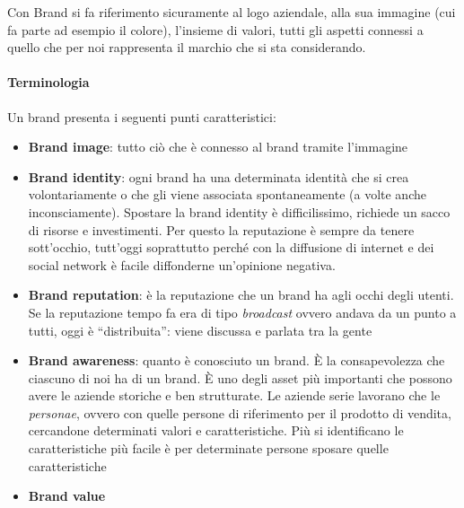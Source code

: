 Con Brand si fa riferimento sicuramente al logo aziendale, alla sua immagine
(cui fa parte ad esempio il colore), l'insieme di valori, tutti gli aspetti
connessi a quello che per noi rappresenta il marchio che si sta considerando.

\paragraph*{Terminologia} Un brand presenta i seguenti punti caratteristici:
\begin{itemize}
 \item \textbf{Brand image}: tutto ciò che è connesso al brand tramite
l'immagine
 \item \textbf{Brand identity}: ogni brand ha una determinata identità che si
crea volontariamente o che gli viene associata spontaneamente (a volte anche
inconsciamente).
Spostare la brand identity è difficilissimo, richiede un sacco di risorse e
investimenti.
Per questo la reputazione è sempre da tenere sott'occhio, tutt'oggi soprattutto
perché con la diffusione di internet e dei social network è facile diffonderne
un'opinione negativa.
 \item \textbf{Brand reputation}: è la reputazione che un brand ha agli occhi
degli utenti.
Se la reputazione tempo fa era di tipo \textit{broadcast} ovvero andava da un
punto a tutti, oggi è ``distribuita'': viene discussa e parlata tra la gente
 \item \textbf{Brand awareness}: quanto è conosciuto un brand.
È la consapevolezza che ciascuno di noi ha di un brand.
È uno degli asset più importanti che possono avere le aziende storiche e ben
strutturate.
Le aziende serie lavorano che le \textit{personae}, ovvero con quelle persone
di riferimento per il prodotto di vendita, cercandone determinati valori e
caratteristiche.
Più si identificano le caratteristiche più facile è per determinate persone
sposare quelle caratteristiche
 \item \textbf{Brand value}
\end{itemize}
